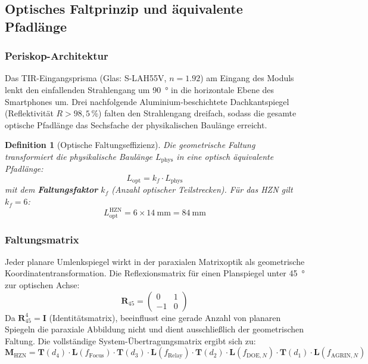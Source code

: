 ﻿\documentclass[12pt,a4paper]{article}
\newtheorem{definition}[theorem]{Definition}
\theoremstyle{definition}
\newcommand{\AGRIN}{\mathrm{AGRIN}}
\newcommand{\DOE}{\mathrm{DOE}}
\begin{document}
	\subsection{Optisches Faltprinzip und \"aquivalente Pfadl\"ange}

	\subsubsection{Periskop-Architektur}

	Das TIR-Eingangsprisma (Glas: S-LAH55V, $n = 1.92$) am Eingang des Moduls
	lenkt den einfallenden Strahlengang um \SI{90}{\degree} in die horizontale
	Ebene des Smartphones um. Drei nachfolgende Aluminium-beschichtete
	Dachkantspiegel (Reflektivit\"at $R > 98{,}5\,\%$) falten den Strahlengang
	dreifach, sodass die gesamte optische Pfadl\"ange das Sechsfache der
	physikalischen Baulänge erreicht.

	\begin{definition}[Optische Faltungseffizienz]
		Die geometrische Faltung transformiert die physikalische Baulänge
		$L_\mathrm{phys}$ in eine optisch \"aquivalente Pfadl\"ange:
		\begin{equation}
			L_\mathrm{opt} = k_f \cdot L_\mathrm{phys}
			\label{eq:fold_path}
		\end{equation}
		mit dem \textbf{Faltungsfaktor} $k_f$ (Anzahl optischer Teilstrecken).
		F\"ur das HZN gilt $k_f = 6$:
		\begin{equation}
			L_\mathrm{opt}^\mathrm{HZN}
			= 6 \times \SI{14}{\milli\metre} = \SI{84}{\milli\metre}
			\label{eq:fold_path_hzn}
		\end{equation}
	\end{definition}

	\subsubsection{Faltungsmatrix}

	Jeder planare Umlenkspiegel wirkt in der paraxialen Matrixoptik als
	geometrische Koordinatentransformation.  Die Reflexionsmatrix f\"ur einen
	Planspiegel unter \SI{45}{\degree} zur optischen Achse:
	\begin{equation}
		\mathbf{R}_{45} =
		\begin{pmatrix} 0 & 1 \\ -1 & 0 \end{pmatrix}
		\label{eq:fold_matrix}
	\end{equation}
	Da $\mathbf{R}_{45}^4 = \mathbf{I}$ (Identit\"atsmatrix), beeinflusst eine
	gerade Anzahl von planaren Spiegeln die paraxiale Abbildung nicht und
	dient ausschlie{\ss}lich der geometrischen Faltung. Die vollst\"andige
	System-\"Ubertragungsmatrix ergibt sich zu:
	\begin{equation}
		\mathbf{M}_\mathrm{HZN} =
		\mathbf{T}(d_4)\cdot\mathbf{L}(f_\mathrm{Focus})\cdot
		\mathbf{T}(d_3)\cdot\mathbf{L}(f_\mathrm{Relay})\cdot
		\mathbf{T}(d_2)\cdot\mathbf{L}(f_{\DOE,N})\cdot
		\mathbf{T}(d_1)\cdot\mathbf{L}(f_{\AGRIN,N})
		\label{eq:rtm_hzn}
	\end{equation}
\end{document}
